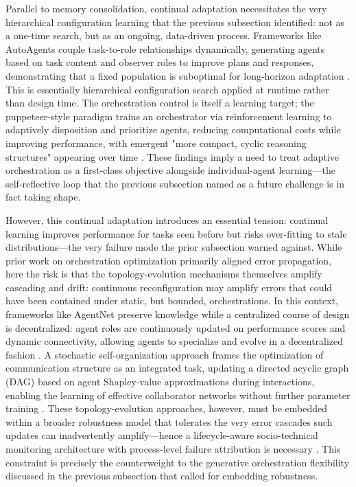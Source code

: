 \documentclass[11pt,a4paper]{article}
\begin{document}
Parallel to memory consolidation, continual adaptation necessitates the very hierarchical configuration learning that the previous subsection identified: not as a one-time search, but as an ongoing, data-driven process. Frameworks like AutoAgents couple task-to-role relationships dynamically, generating agents based on task content and observer roles to improve plans and responses, demonstrating that a fixed population is suboptimal for long-horizon adaptation \cite{arxiv:2309.17288v2}. This is essentially hierarchical configuration search applied at runtime rather than design time. The orchestration control is itself a learning target; the puppeteer-style paradigm trains an orchestrator via reinforcement learning to adaptively disposition and prioritize agents, reducing computational costs while improving performance, with emergent "more compact, cyclic reasoning structures" appearing over time \cite{arxiv:2505.19591v2}. These findings imply a need to treat adaptive orchestration as a first-class objective alongside individual-agent learning---the self-reflective loop that the previous subsection named as a future challenge is in fact taking shape.

However, this continual adaptation introduces an essential tension: continual learning improves performance for tasks seen before but risks over-fitting to stale distributions---the very failure mode the prior subsection warned against. While prior work on orchestration optimization primarily aligned error propagation, here the risk is that the topology-evolution mechanisms themselves amplify cascading and drift: continuous reconfiguration may amplify errors that could have been contained under static, but bounded, orchestrations. In this context, frameworks like AgentNet preserve knowledge while a centralized course of design is decentralized: agent roles are continuously updated on performance scores and dynamic connectivity, allowing agents to specialize and evolve in a decentralized fashion \cite{arxiv:2507.10644v4}. A stochastic self-organization approach frames the optimization of communication structure as an integrated task, updating a directed acyclic graph (DAG) based on agent Shapley-value approximations during interactions, enabling the learning of effective collaborator networks without further parameter training \cite{arxiv:2510.00685v2}. These topology-evolution approaches, however, must be embedded within a broader robustness model that tolerates the very error cascades such updates can inadvertently amplify---hence a lifecycle-aware socio-technical monitoring architecture with process-level failure attribution is necessary \cite{arxiv:2308.05960v1,arxiv:2412.17481v2}. This constraint is precisely the counterweight to the generative orchestration flexibility discussed in the previous subsection that called for embedding robustness.
\end{document}
